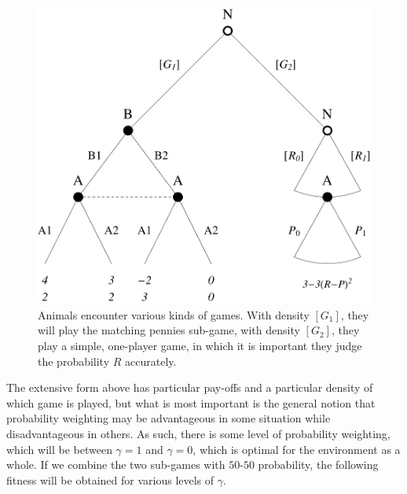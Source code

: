 \documentclass[a4paper,10pt]{article}
\numberwithin{equation}{section}
\begin{document}
\begin{figure}[h]
\begin{center}
\leavevmode
\includegraphics[scale=.52]{Graph8.pdf}
\captionsetup{width=360pt}
\caption{Animals encounter various kinds of games. With density $[G_1]$, they will play the matching pennies sub-game, with density $[G_2]$, they play a simple, one-player game, in which it is important they judge the probability $R$ accurately.}
\label{fig:Graph8.pdf}
\end{center}
\end{figure}

The extensive form above has particular pay-offs and a particular density of which game is played, but what is most important is the general notion that probability weighting may be advantageous in some situation while disadvantageous in others. As such, there is some level of probability weighting, which will be between $\gamma=1$ and $\gamma=0$, which is optimal for the environment as a whole. If we combine the two sub-games with $50$-$50$ probability, the following fitness will be obtained for various levels of $\gamma$.
\end{document}
